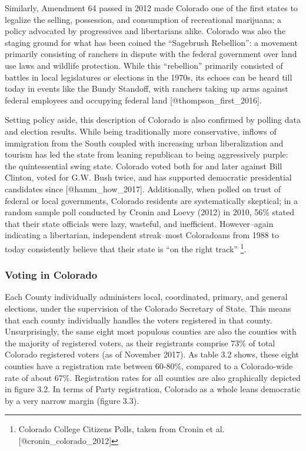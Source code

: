 \documentclass[]{article}
\let\rmarkdownfootnote\footnote%
\def\footnote{\protect\rmarkdownfootnote}
\begin{document}
Similarly, Amendment 64 passed in 2012 made Colorado one of the first
states to legalize the selling, possession, and consumption of
recreational marijuana; a policy advocated by progressives and
libertarians alike. Colorado was also the staging ground for what has
been coined the ``Sagebrush Rebellion'': a movement primarily consisting
of ranchers in dispute with the federal government over land use laws
and wildlife protection. While this ``rebellion'' primarily consisted of
battles in local legislatures or elections in the 1970s, its echoes can
be heard till today in events like the Bundy Standoff, with ranchers
taking up arms against federal employees and occupying federal land
{[}@thompson\_first\_2016{]}.

Setting policy aside, this description of Colorado is also confirmed by
polling data and election results. While being traditionally more
conservative, inflows of immigration from the South coupled with
increasing urban liberalization and tourism has led the state from
leaning republican to being aggressively purple: the quintessential
swing state. Colorado voted both for and later against Bill Clinton,
voted for G.W. Bush twice, and has supported democratic presidential
candidates since {[}@hamm\_how\_2017{]}. Additionally, when polled on
trust of federal or local governments, Colorado residents are
systematically skeptical; in a random sample poll conducted by Cronin
and Loevy (2012) in 2010, 56\% stated that their state officials were
lazy, wasteful, and inefficient. However--again indicating a
libertarian, independent streak--most Coloradoans from 1988 to today
consistently believe that their state is ``on the right track''
\footnote{Colorado College Citizens Polls, taken from Cronin et al.
  {[}@cronin\_colorado\_2012{]}}.

\subsubsection{Voting in Colorado}\label{voting-in-colorado}

Each County individually administers local, coordinated, primary, and
general elections, under the supervision of the Colorado Secretary of
State. This means that each county individually handles the voters
registered in that county. Unsurprisingly, the same eight most populous
counties are also the counties with the majority of registered voters,
as their registrants comprise 73\% of total Colorado registered voters
(as of November 2017). As table 3.2 shows, these eight counties have a
registration rate between 60-80\%, compared to a Colorado-wide rate of
about 67\%. Registration rates for all counties are also graphically
depicted in figure 3.2. In terms of Party registration, Colorado as a
whole leans democratic by a very narrow margin (figure 3.3).
\end{document}
